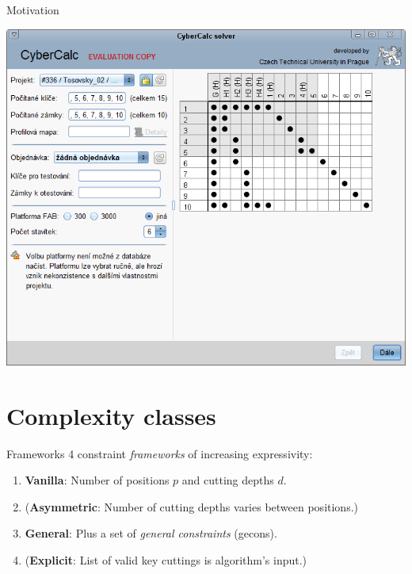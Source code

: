 \begin{frame}{Motivation}
  \begin{center}
    \includegraphics[width=\textwidth]{Extension.png}
  \end{center}
\end{frame}



\section{Complexity classes}
\sectionframe



\begin{frame}{Frameworks}
  4 constraint \textit{frameworks} of increasing expressivity:
  \begin{enumerate}
    \item \textbf{Vanilla}: Number of positions $p$ and cutting depths $d$.
    \item (\textbf{Asymmetric}: Number of cutting depths varies between positions.)
    \item \textbf{General}: Plus a set of \textit{general constraints} (gecons).
    \item (\textbf{Explicit}: List of valid key cuttings is algorithm's input.)
  \end{enumerate}
\end{frame}

